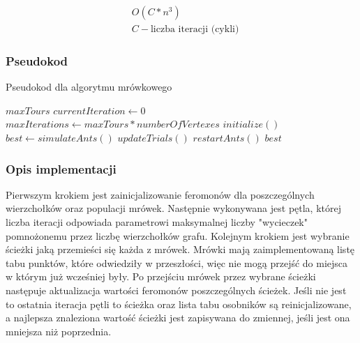 \documentclass[12pt,a4paper,titlepage]{article}
\begin{document}
\begin{myequation}[H]
\begin{equation}
    \begin{split}
        &O(C*n^{3}) \\
        &C - \text{liczba iteracji (cykli)}
    \end{split}
\end{equation}
\end{myequation}

\subsubsection{Pseudokod}
\begin{algorithm}[H]
\caption{Pseudokod dla algorytmu mrówkowego}
\begin{algorithmic}
\Require $maxTours$
\State $currentIteration \gets 0$
\State $maxIterations \gets maxTours * numberOfVertexes$
\State $initialize()$
        \State $best \gets simulateAnts()$
        \State $updateTrials()$
            \State $restartAnts()$
        \EndIf
    \EndIf
\EndWhile
\State \Return $best$
\end{algorithmic}
\end{algorithm}

\subsubsection{Opis implementacji}
Pierwszym krokiem jest zainicjalizowanie feromonów dla poszczególnych wierzchołków oraz populacji mrówek. Następnie wykonywana jest pętla, której liczba iteracji odpowiada parametrowi maksymalnej liczby "wycieczek" pomnożonemu przez liczbę wierzchołków grafu. Kolejnym krokiem jest wybranie ścieżki jaką przemieści się każda z mrówek. Mrówki mają zaimplementowaną listę tabu punktów, które odwiedziły w przeszłości, więc nie mogą przejść do miejsca w którym już wcześniej były. Po przejściu mrówek przez wybrane ścieżki następuje aktualizacja wartości feromonów poszczególnych ścieżek. Jeśli nie jest to ostatnia iteracja pętli to ścieżka oraz lista tabu osobników są reinicjalizowane, a najlepsza znaleziona wartość ścieżki jest zapisywana do zmiennej, jeśli jest ona mniejsza niż poprzednia.
\end{document}
